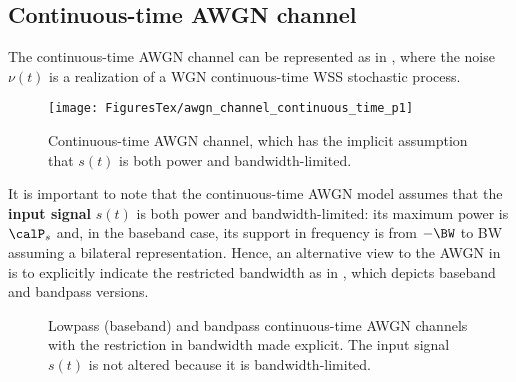 %
%
%

\subsection{Continuous-time AWGN channel}
\label{sec:continuousTimeAWGN}

The continuous-time AWGN channel can be represented as in ,
where the noise $\nu(t)$ is a realization of a WGN continuous-time WSS stochastic process.

\begin{figure}[htbp]
\centering
\texttt{[image: FiguresTex/awgn\_channel\_continuous\_time\_p1]}
\caption{Continuous-time AWGN channel, which has the implicit assumption that $s(t)$ is both power and bandwidth-limited.\label{fig:awgn_channel_continuous_time_p1}}
\end{figure}

It is important to note that the continuous-time AWGN model assumes that the \textbf{input signal} $s(t)$ is both power and bandwidth-limited: its maximum power is $\calP_s$ and, in the baseband case, its support in frequency is from $-\BW$ to BW assuming a bilateral representation. Hence, an alternative view to 
the AWGN in  is to explicitly indicate the restricted bandwidth as in , which depicts baseband and bandpass versions.

\begin{figure}[htbp]
\centering
  \caption[Lowpass (baseband) and bandpass continuous-time AWGN channels.]{Lowpass (baseband) and bandpass continuous-time AWGN channels with the restriction in bandwidth made explicit. The input
	signal $s(t)$ is not altered because it is bandwidth-limited.}
  \label{fig:awgnChannels}
\end{figure}

